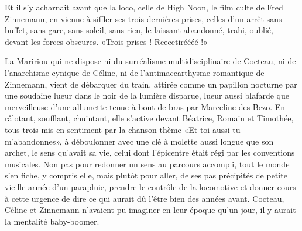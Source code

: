 
Et il s’y acharnait avant que la loco, celle de High Noon, le film culte de Fred Zinnemann, en vienne à siffler ses trois dernières prises, celles d’un arrêt sans buffet, sans gare, sans soleil, sans rien, le laissant abandonné, trahi, oublié, devant les forces obscures. «Trois prises ! Reeeetiréééé !» 

La Maririou qui ne dispose ni du surréalisme multidisciplinaire de Cocteau, ni de l’anarchisme cynique de Céline, ni de l’antimaccarthysme romantique de Zinnemann, vient de débarquer du train, attirée comme un papillon nocturne par une soudaine lueur dans le noir de la lumière disparue, lueur aussi blafarde que merveilleuse d’une allumette tenue à bout de bras par Marceline des Bezo. En râlotant, soufflant, chuintant, elle s’active devant Béatrice, Romain et Timothée, tous trois mis en sentiment par la chanson thème «Et toi aussi tu m’abandonnes», à déboulonner avec une clé à molette aussi longue que son archet, le sens qu’avait sa vie, celui dont l’épicentre était régi par les conventions musicales. Non pas pour redonner un sens au parcours accompli, tout le monde s’en fiche, y compris elle, mais plutôt pour aller, de ses pas précipités de petite vieille armée d’un parapluie, prendre le contrôle de la locomotive et donner cours à cette urgence de dire ce qui aurait dû l’être bien des années avant. Cocteau, Céline et Zinnemann n’avaient pu imaginer en leur époque qu’un jour, il y aurait la mentalité baby-boomer.

